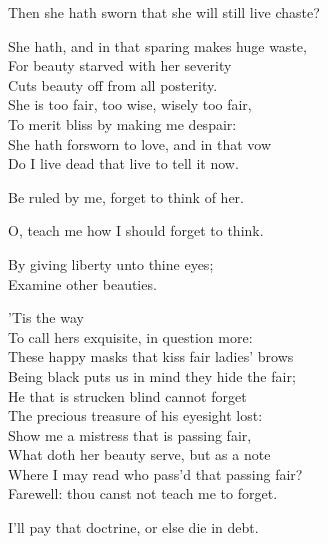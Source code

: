 \begin{speech}
Then she hath sworn that she will still live chaste?
\\
\end{speech}
\begin{speech}
She hath, and in that sparing makes huge waste, \\

For beauty starved with her severity \\
Cuts beauty off from all posterity. \\
She is too fair, too wise, wisely too fair, \\
To merit bliss by making me despair: \\
She hath forsworn to love, and in that vow \\
Do I live dead that live to tell it now. \\
\end{speech}
\begin{speech}
Be ruled by me, forget to think of her. \\
\end{speech}
\begin{speech}
O, teach me how I should forget to think. \\
\end{speech}
\begin{speech}
By giving liberty unto thine eyes; \\
Examine other beauties. \\
\end{speech}
\begin{speech}
'Tis the way \\
To call hers exquisite, in question more: \\
These happy masks that kiss fair ladies' brows \\
Being black puts us in mind they hide the fair; \\
He that is strucken blind cannot forget \\
The precious treasure of his eyesight lost: \\
Show me a mistress that is passing fair, \\
What doth her beauty serve, but as a note \\
Where I may read who pass'd that passing fair? \\
Farewell: thou canst not teach me to forget. \\
\end{speech}
\begin{speech}
I'll pay that doctrine, or else die in debt.  \\
\end{speech}


